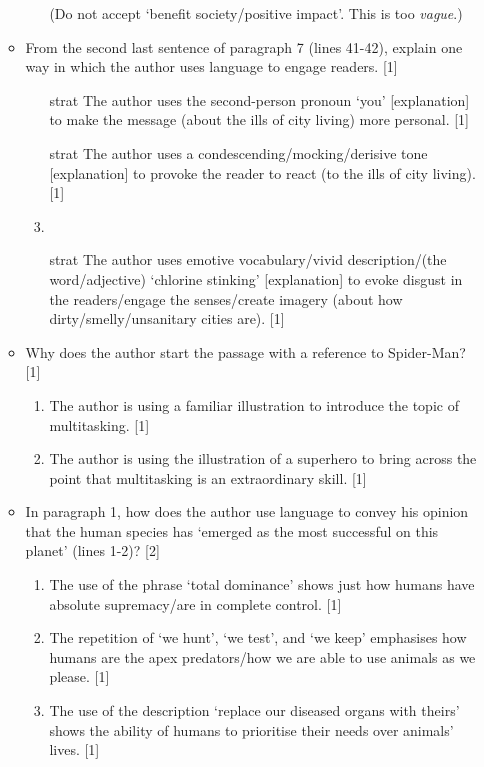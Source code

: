\documentclass[oneside]{book}
\begin{document}
\begin{itemize}
\begin{itemize}
\begin{enumerate}[label=(\alph*)]
            (Do not accept `benefit society/positive impact'. This is too \emph{vague}.)
        \end{enumerate}
        \item From the second last sentence of paragraph 7 (lines 41-42), explain one way in which the author uses language to engage readers. [1]
        \begin{enumerate}[label=(\alph*)]
            \item [strat] The author uses the second-person pronoun `you' [explanation] to make the message (about the ills of city living) more personal. [1]
            \item [strat] The author uses a condescending/mocking/derisive tone [explanation] to provoke the reader to react (to the ills of city living). [1]
            \item \item [strat]The author uses emotive vocabulary/vivid description/(the word/adjective) `chlorine stinking' [explanation] to evoke disgust in the readers/engage the senses/create imagery (about how dirty/smelly/unsanitary cities are). [1]
        \end{enumerate}
        \item Why does the author start the passage with a reference to Spider-Man? [1]
        \begin{enumerate}[label=(\alph*)]
            \item The author is using a familiar illustration to introduce the topic of multitasking. [1]
            \item The author is using the illustration of a superhero to bring across the point that multitasking is an extraordinary skill. [1]
        \end{enumerate}
        \item In paragraph 1, how does the author use language to convey his opinion that the human species has `emerged as the most successful on this planet' (lines 1-2)? [2]
        \begin{enumerate}[label=(\alph*)]
            \item The use of the phrase `total dominance' shows just how humans have absolute supremacy/are in complete control. [1]
            \item The repetition of `we hunt', `we test', and `we keep' emphasises how humans are the apex predators/how we are able to use animals as we please. [1]
            \item The use of the description `replace our diseased organs with theirs' shows the ability of humans to prioritise their needs over animals' lives. [1]

\end{enumerate}
\end{itemize}
\end{itemize}
\end{document}
